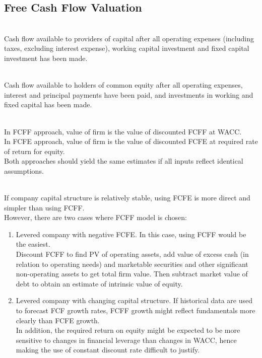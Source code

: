 \subsection{Free Cash Flow Valuation}

\begin{definition} \\
Cash flow available to providers of capital after all operating expenses (including taxes, excluding interest expense), working capital investment and fixed capital investment has been made.
\end{definition}

\begin{definition} \\
Cash flow available to holders of common equity after all operating expenses, interest and principal payments have been paid, and investments in working and fixed capital has been made.
\end{definition}

\begin{remark} \\
In FCFF approach, value of firm is the value of discounted FCFF at WACC.\\
In FCFE approach, value of firm is the value of discounted FCFE at required rate of return for equity.\\
Both approaches should yield the same estimates if all inputs reflect identical assumptions.
\end{remark}

\begin{remark} \\
If company capital structure is relatively stable, using FCFE is more direct and simpler than using FCFF.\\
However, there are two cases where FCFF model is chosen:
\begin{enumerate}[label=\roman*.]
\setlength{\itemsep}{0pt}
\item Levered company with negative FCFE. In this case, using FCFF would be the easiest.\\
Discount FCFF to find PV of operating assets, add value of excess cash (in relation to operating needs) and marketable securities and other significant non-operating assets to get total firm value. Then subtract market value of debt to obtain an estimate of intrinsic value of equity.
\item Levered company with changing capital structure. If historical data are used to forecast FCF growth rates, FCFF growth might reflect fundamentals more clearly than FCFE growth.\\
In addition, the required return on equity might be expected to be more sensitive to changes in financial leverage than changes in WACC, hence making the use of constant discount rate difficult to justify.
\end{enumerate}
\end{remark}

